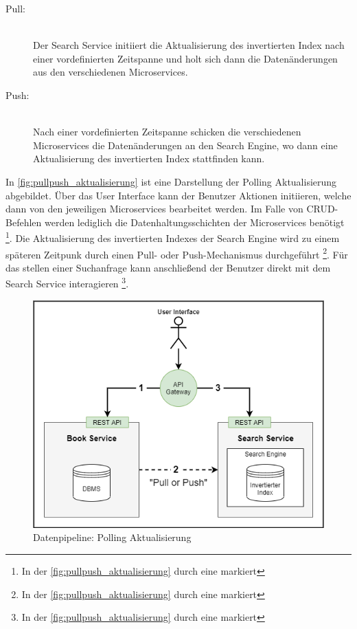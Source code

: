 \begin{description}
    \item[Pull:]\hfill \\
    Der Search Service initiiert die Aktualisierung des invertierten Index nach einer vordefinierten Zeitspanne und holt sich dann die Datenänderungen aus den verschiedenen Microservices.
    
    \item[Push:]\hfill \\
    Nach einer vordefinierten Zeitspanne schicken die verschiedenen Microservices die Datenänderungen an den Search Engine, wo dann eine Aktualisierung des invertierten Index stattfinden kann.

\end{description}

In \autoref{fig:pullpush_aktualisierung} ist eine Darstellung der Polling Aktualisierung abgebildet. Über das User Interface kann der Benutzer Aktionen initiieren, welche dann von den jeweiligen Microservices bearbeitet werden. Im Falle von CRUD-Befehlen werden lediglich die Datenhaltungsschichten der Microservices benötigt \footnote{In der \autoref{fig:pullpush_aktualisierung} durch eine \grqq{} markiert}. Die Aktualisierung des invertierten Indexes der Search Engine wird zu einem späteren Zeitpunk durch einen Pull- oder Push-Mechanismus durchgeführt \footnote{In der \autoref{fig:pullpush_aktualisierung} durch eine \grqq{} markiert}. Für das stellen einer Suchanfrage kann anschließend der Benutzer direkt mit dem Search Service interagieren \footnote{In der \autoref{fig:pullpush_aktualisierung} durch eine \grqq{} markiert}.

\begin{figure}[H]
    \centering
    \includegraphics[width=0.6\linewidth]{images/pullpush_aktualisierung.png}
    \caption{Datenpipeline: Polling Aktualisierung}
    \label{fig:pullpush_aktualisierung}
\end{figure}

